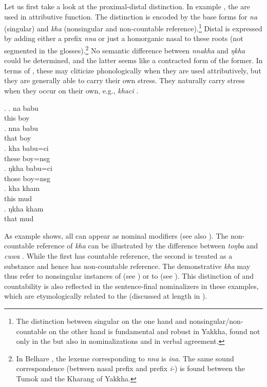Let us first take a look at the proximal-distal distinction.  In example \Next, the  are used in attributive function. The  distinction is encoded by the base forms for  \emph{na} (singular) and \emph{kha} (nonsingular and non-countable reference).\footnote{The distinction between singular on the one hand and nonsingular/non-countable on the other hand is fundamental and robust in Yakkha, found not only in the   but also in nominalizations and in verbal agreement.}  Distal  is expressed by adding either a prefix \emph{nna} or just a homorganic nasal to these roots (not segmented in the glosses).\footnote{In Belhare \citep[548]{Bickel2003Belhare}, the lexeme corresponding to \emph{nna} is \emph{ina}. The same sound correspondence (between nasal prefix and prefix \emph{i-}) is found between the Tumok and  the Kharang  of Yakkha.} No semantic difference between \emph{nnakha} and \emph{ŋkha} could be determined, and the latter seems like a contracted form of the former. In terms of , these  may cliticize phonologically when they are used attributively, but they are generally able to carry their own stress. They naturally  carry stress when they occur on their own, e.g., \emph{khaci} .

\ex. \ag. na babu \\
	this boy\\
	\bg. nna babu \\
		that boy\\
	\bg. kha babu=ci\\
		these boy{\sc =nsg}\\
	\bg. ŋkha babu=ci\\
		those boy{\sc =nsg}\\
		\bg. kha kham\\
		this mud\\
	\bg. ŋkha kham\\
		that mud\\

As example \Last shows, all  can appear as nominal modifiers (see also \Next). The non-countable reference of \emph{kha} can be illustrated by the difference between \emph{toŋba}  and \emph{cuwa} . While the first has countable reference, the second is treated as a substance and hence has non-countable reference. The demonstrative \emph{kha} may thus refer to nonsingular instances of  (see \Next[b]) or to   (see \Next[c]). This distinction of  and countability is also reflected in the sentence-final nominalizers in these examples, which are etymologically related to the  (discussed at length in ).

